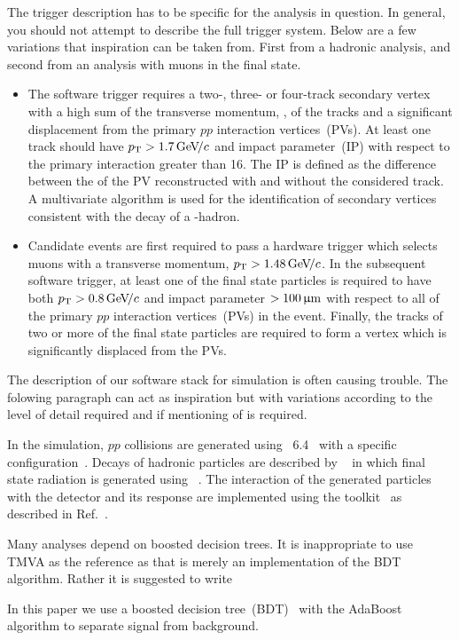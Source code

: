 The trigger description has to be specific for the analysis in
question. In general, you should not attempt to describe the full
trigger system. Below are a few variations that inspiration can be
taken from. First from a hadronic analysis, and second from an
analysis with muons in the final state.
\begin{itemize}
\item The software trigger requires a two-, three- or four-track
  secondary vertex with a high sum of the transverse momentum, \pt, of
  the tracks and a significant displacement from the primary $pp$
  interaction vertices~(PVs). At least one track should have $\mbox{$p_{\rm T}$} >
  1.7{\mathrm{\,Ge\kern -0.1em V\!/}c}$ and impact parameter~(IP) \chisq with respect to the
  primary interaction greater than 16. The IP \chisq is defined as the
  difference between the \chisq of the PV reconstructed with and
  without the considered track. A multivariate algorithm is used for
  the identification of secondary vertices consistent with the decay
  of a \bquark-hadron.
\item Candidate events are first required to pass a hardware trigger
  which selects muons with a transverse momentum, $\mbox{$p_{\rm T}$}>1.48{\mathrm{\,Ge\kern -0.1em V\!/}c}$. In
  the subsequent software trigger, at least
  one of the final state particles is required to have both
  $\mbox{$p_{\rm T}$}>0.8{\mathrm{\,Ge\kern -0.1em V\!/}c}$ and impact parameter $>100\,\upmu\rm m$ with respect to all
  of the primary $pp$ interaction vertices~(PVs) in the
  event. Finally, the tracks of two or more of the final state
  particles are required to form a vertex which is significantly
  displaced from the PVs.
\end{itemize}

The description of our software stack for simulation is often
causing trouble. The folowing paragraph can act as inspiration but
with variations according to the level of detail required and if
mentioning of \eg \photos is required.

In the simulation, $pp$ collisions are generated using
\pythia~6.4~\cite{Sjostrand:2006za} with a specific \lhcb
configuration~\cite{LHCb-PROC-2010-056}.  Decays of hadronic particles
are described by \evtgen~\cite{Lange:2001uf} in which final state
radiation is generated using \photos~\cite{Golonka:2005pn}. The
interaction of the generated particles with the detector and its
response are implemented using the \geant
toolkit~\cite{Allison:2006ve, *Agostinelli:2002hh} as described in
Ref.~\cite{LHCb-PROC-2011-006}.

Many analyses depend on boosted decision trees. It is inappropriate to
use TMVA as the reference as that is merely an implementation of the
BDT algorithm. Rather it is suggested to write

In this paper we use a boosted decision tree~(BDT)~\cite{Breiman} with
the AdaBoost algorithm\cite{AdaBoost} to separate signal from
background.
